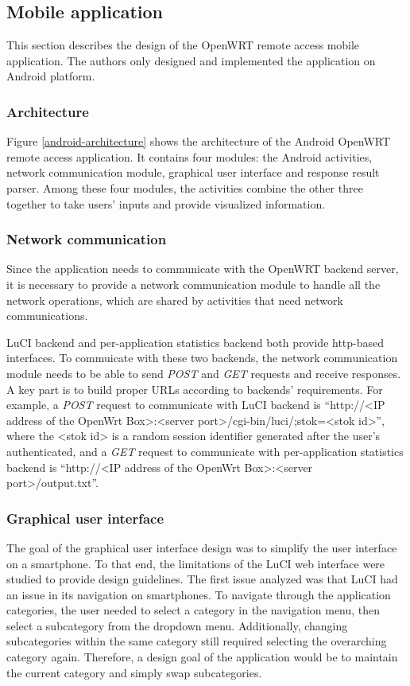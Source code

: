 \subsection{Mobile application}

This section describes the design of the OpenWRT remote access mobile application. The authors only designed and implemented the application on Android platform.

\subsubsection{Architecture}
Figure \ref{android-architecture} shows the architecture of the Android OpenWRT remote access application. It contains four modules: the Android activities, network communication module, graphical user interface and response result parser. Among these four modules, the activities combine the other three together to take users' inputs and provide visualized information.

\subsubsection{Network communication}
Since the application needs to communicate with the OpenWRT backend server, it is necessary to provide a network communication module to handle all the network operations, which are shared by activities that need network communications.

LuCI backend and per-application statistics backend both provide http-based interfaces. To commuicate with these two backends, the network communication module needs to be able to send \textit{POST} and \textit{GET} requests and receive responses. A key part is to build proper URLs according to backends' requirements. For example, a \textit{POST} request to communicate with LuCI backend is ``http://<IP address of the OpenWrt Box>:<server port>/cgi-bin/luci/;stok=<stok id>'', where the <stok id> is a random session identifier generated after the user's authenticated, and a \textit{GET} request to communicate with per-application statistics backend is ``http://<IP address of the OpenWrt Box>:<server port>/output.txt''.

\subsubsection{Graphical user interface}
The goal of the graphical user interface design was to simplify the user interface on a smartphone. To that end, the limitations of the LuCI web interface were studied to provide design guidelines. The first issue analyzed was that LuCI had an issue in its navigation on smartphones. To navigate through the application categories, the user needed to select a category in the navigation menu, then select a subcategory from the dropdown menu. Additionally, changing subcategories within the same category still required selecting the overarching category again. Therefore, a design goal of the application would be to maintain the current category and simply swap subcategories.
	

